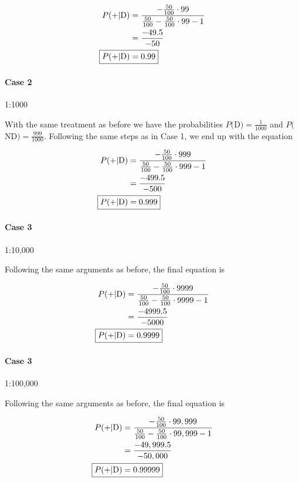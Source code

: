 \documentclass[9pt,a4paper,twocolumn]{article}
\begin{document}
\begin{align}
	P(+|\mathrm{D}) &= \frac{-\frac{50}{100}\cdot 99}{\frac{50}{100} - \frac{50}{100}\cdot 99 - 1} \nonumber \\
	&= \frac{-49.5}{-50} \nonumber \\
	\Aboxed{
		P(+|\mathrm{D}) &= 0.99 \label{eq:answer-100}
	}
\end{align}

\paragraph{Case 2} 1:1000

With the same treatment as before we have the probabilities $P($D$) = \frac{1}{1000}$ and $P($ND$) = \frac{999}{1000}$. Following the same steps as in Case 1, we end up with the equation

\begin{align}
	P(+|\mathrm{D}) &= \frac{-\frac{50}{100}\cdot 999}{\frac{50}{100} - \frac{50}{100}\cdot 999 - 1} \nonumber \\
	&= \frac{-499.5}{-500} \nonumber \\
	\Aboxed{
		P(+|\mathrm{D}) &= 0.999 \label{eq:answer-1000}
	}
\end{align}

\paragraph{Case 3} 1:10,000

Following the same arguments as before, the final equation is

\begin{align}
	P(+|\mathrm{D}) &= \frac{-\frac{50}{100}\cdot 9999}{\frac{50}{100} - \frac{50}{100}\cdot 9999 - 1} \nonumber \\
	&= \frac{-4999.5}{-5000} \nonumber \\
	\Aboxed{
		P(+|\mathrm{D}) &= 0.9999 \label{eq:answer-10000}
	}
\end{align}

\paragraph{Case 3} 1:100,000

Following the same arguments as before, the final equation is

\begin{align}
	P(+|\mathrm{D}) &= \frac{-\frac{50}{100}\cdot 99,999}{\frac{50}{100} - \frac{50}{100}\cdot 99,999 - 1} \nonumber \\
	&= \frac{-49,999.5}{-50,000} \nonumber \\
	\Aboxed{
		P(+|\mathrm{D}) &= 0.99999 \label{eq:answer-100000}
	}
\end{align}
\end{document}
